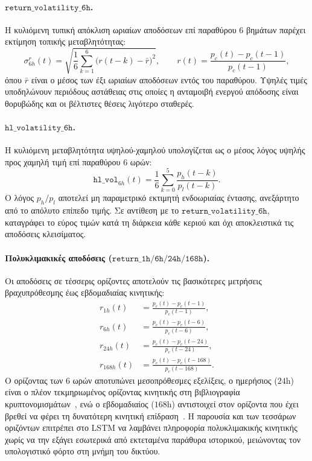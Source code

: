 \paragraph{$\mathtt{return\_volatility\_6h}$.}
Η κυλιόμενη τυπική απόκλιση ωριαίων αποδόσεων επί παραθύρου $6$ βημάτων
παρέχει εκτίμηση τοπικής μεταβλητότητας:
\begin{equation}
  \sigma^{r}_{6h}(t) = \sqrt{\frac{1}{6}\sum_{k=1}^{6}\bigl(r(t-k) - \bar{r}\bigr)^2},
  \qquad r(t) = \frac{p_c(t) - p_c(t-1)}{p_c(t-1)},
  \label{eq:retvol6h}
\end{equation}
όπου $\bar{r}$ είναι ο μέσος των έξι ωριαίων αποδόσεων εντός του παραθύρου.
Υψηλές τιμές υποδηλώνουν περιόδους αστάθειας στις οποίες η ανταμοιβή ενεργού
απόδοσης είναι θορυβώδης και οι βέλτιστες θέσεις λιγότερο σταθερές.

\paragraph{$\mathtt{hl\_volatility\_6h}$.}
Η κυλιόμενη μεταβλητότητα υψηλού-χαμηλού υπολογίζεται ως ο μέσος λόγος υψηλής
προς χαμηλή τιμή επί παραθύρου $6$ ωρών:
\begin{equation}
  \mathtt{hl\_vol}_{6h}(t) = \frac{1}{6}\sum_{k=0}^{5}\frac{p_h(t-k)}{p_l(t-k)}.
  \label{eq:hlvol6h}
\end{equation}
Ο λόγος $p_h/p_l$ αποτελεί μη παραμετρικό εκτιμητή ενδοωριαίας έντασης,
ανεξάρτητο από το απόλυτο επίπεδο τιμής. Σε αντίθεση με το
$\mathtt{return\_volatility\_6h}$, καταγράφει το εύρος τιμών κατά τη διάρκεια
κάθε κεριού και όχι αποκλειστικά τις αποδόσεις κλεισίματος.

\paragraph{Πολυκλιμακικές αποδόσεις ($\mathtt{return\_1h/6h/24h/168h}$).}
Οι αποδόσεις σε τέσσερις ορίζοντες αποτελούν τις βασικότερες μετρήσεις
βραχυπρόθεσμης έως εβδομαδιαίας κινητικής:
\begin{align}
  r_{1h}(t)   &= \frac{p_c(t) - p_c(t-1)}{p_c(t-1)},   \label{eq:ret1h}\\[2pt]
  r_{6h}(t)   &= \frac{p_c(t) - p_c(t-6)}{p_c(t-6)},   \label{eq:ret6h}\\[2pt]
  r_{24h}(t)  &= \frac{p_c(t) - p_c(t-24)}{p_c(t-24)}, \label{eq:ret24h}\\[2pt]
  r_{168h}(t) &= \frac{p_c(t) - p_c(t-168)}{p_c(t-168)}. \label{eq:ret168h}
\end{align}
Ο ορίζοντας των $6$ ωρών αποτυπώνει μεσοπρόθεσμες εξελίξεις, ο ημερήσιος
($24$h) είναι ο πλέον τεκμηριωμένος ορίζοντας κινητικής στη βιβλιογραφία
κρυπτονομισμάτων~\cite{liutsyvinski2021}, ενώ ο εβδομαδιαίος ($168$h) αντιστοιχεί στον
ορίζοντα που έχει βρεθεί να φέρει τη δυνατότερη κινητική
επίδραση~\cite{liutsyvinski2021}. Η παρουσία και των τεσσάρων οριζόντων επιτρέπει στο
LSTM να λαμβάνει πληροφορία πολυκλιμακικής κινητικής χωρίς να την εξάγει
εσωτερικά από εκτεταμένα παράθυρα ιστορικού, μειώνοντας τον υπολογιστικό
φόρτο στη μνήμη του δικτύου.


